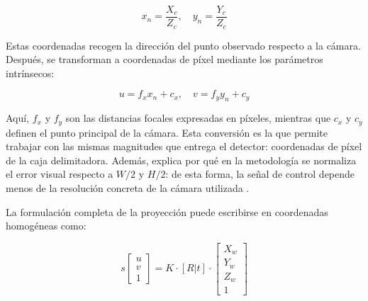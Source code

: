 \vspace{0.3cm}

\begin{equation}
x_n = \frac{X_c}{Z_c}, \quad y_n = \frac{Y_c}{Z_c}
\end{equation}

\vspace{0.3cm}

Estas coordenadas recogen la dirección del punto observado respecto a la cámara. Después, se transforman a coordenadas de píxel mediante los parámetros intrínsecos:

\vspace{0.3cm}

\begin{equation}
u = f_x x_n + c_x, \quad v = f_y y_n + c_y
\end{equation}

\vspace{0.3cm}

Aquí, $f_x$ y $f_y$ son las distancias focales expresadas en píxeles, mientras que $c_x$ y $c_y$ definen el punto principal de la cámara. Esta conversión es la que permite trabajar con las mismas magnitudes que entrega el detector: coordenadas de píxel de la caja delimitadora. Además, explica por qué en la metodología se normaliza el error visual respecto a $W/2$ y $H/2$: de esta forma, la señal de control depende menos de la resolución concreta de la cámara utilizada \cite{CameraModels, opencvCalib3d}.

\vspace{0.3cm}

La formulación completa de la proyección puede escribirse en coordenadas homogéneas como:

\vspace{0.3cm}

\begin{equation}
s \left[\begin{array}{c}
u \\ v \\ 1\end{array}\right] = K \cdot [R|t] \cdot \left[\begin{array}{c}X_w \\ Y_w \\ Z_w \\ 1\end{array}\right]
\end{equation}

\vspace{0.3cm}

